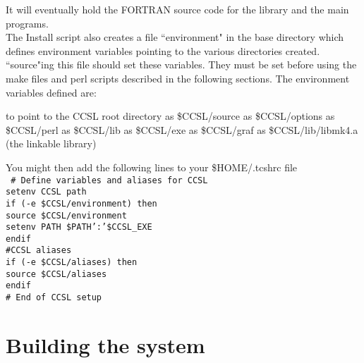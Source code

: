 \documentclass[onecolumn,twoside,11pt,a4paper]{report}
\begin{document}
It will eventually hold the FORTRAN source code for the library and 
the main programs.
\\[1ex]
The Install script also creates a file ``environment" in the base directory
which defines environment variables pointing to the various directories
created. ``source"ing this file should set these variables. They must be set
before using the make files and perl scripts described in the following
sections.
The environment variables defined are:
\begin{listdirectory}
          {to point to the CCSL root directory}
      {as \$CCSL/source}
     {as \$CCSL/options}
     {as \$CCSL/perl}
      {as \$CCSL/lib}
      {as \$CCSL/exe}
     {as \$CCSL/graf}
      {as \$CCSL/lib/libmk4.a (the linkable library)}
\end{listdirectory}
You might then add  the following lines to your
\$HOME/.tcshrc file\\
\texttt{
\# Define variables and aliases for CCSL\\setenv CCSL path\\
if (-e \$CCSL/environment) then\\
\hspace*{3em}source \$CCSL/environment\\
\hspace*{3em}setenv PATH \$PATH':'\$CCSL\_EXE\\
endif\\
\#CCSL aliases\\ 
if (-e \$CCSL/aliases) then\\
\hspace*{3em}source \$CCSL/aliases\\
endif\\
\# End of CCSL setup\\}
%
\section{Building the system}
\end{document}
